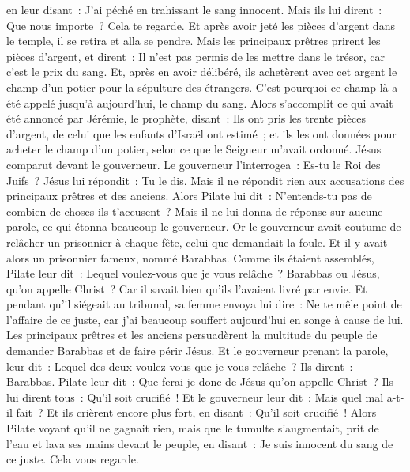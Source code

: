 \begin{multicols}{2}
en leur disant~: J'ai péché en trahissant le sang innocent. Mais ils lui dirent~: Que nous importe~? Cela te regarde.
Et après avoir jeté les pièces d'argent dans le temple, il se retira et alla se pendre.
Mais les principaux prêtres prirent les pièces d'argent, et dirent~: Il n'est pas permis de les mettre dans le trésor, car c'est le prix du sang.
Et, après en avoir délibéré, ils achetèrent avec cet argent le champ d'un potier pour la sépulture des étrangers.
C'est pourquoi ce champ-là a été appelé jusqu'à aujourd'hui, le champ du sang.
Alors s'accomplit ce qui avait été annoncé par Jérémie, le prophète, disant~: Ils ont pris les trente pièces d'argent, de celui que les enfants d'Israël ont estimé~;
et ils les ont données pour acheter le champ d'un potier, selon ce que le Seigneur m'avait ordonné.
Jésus comparut devant le gouverneur. Le gouverneur l'interrogea~: Es-tu le Roi des Juifs~? Jésus lui répondit~: Tu le dis.
Mais il ne répondit rien aux accusations des principaux prêtres et des anciens.
Alors Pilate lui dit~: N'entends-tu pas de combien de choses ils t'accusent~?
Mais il ne lui donna de réponse sur aucune parole, ce qui étonna beaucoup le gouverneur.
Or le gouverneur avait coutume de relâcher un prisonnier à chaque fête, celui que demandait la foule.
Et il y avait alors un prisonnier fameux, nommé Barabbas.
Comme ils étaient assemblés, Pilate leur dit~: Lequel voulez-vous que je vous relâche~? Barabbas ou Jésus, qu'on appelle Christ~?
Car il savait bien qu'ils l'avaient livré par envie.
Et pendant qu'il siégeait au tribunal, sa femme envoya lui dire~: Ne te mêle point de l'affaire de ce juste, car j'ai beaucoup souffert aujourd'hui en songe à cause de lui.
Les principaux prêtres et les anciens persuadèrent la multitude du peuple de demander Barabbas et de faire périr Jésus.
Et le gouverneur prenant la parole, leur dit~: Lequel des deux voulez-vous que je vous relâche~? Ils dirent~: Barabbas.
Pilate leur dit~: Que ferai-je donc de Jésus qu'on appelle Christ~? Ils lui dirent tous~: Qu'il soit crucifié~!
Et le gouverneur leur dit~: Mais quel mal a-t-il fait~? Et ils crièrent encore plus fort, en disant~: Qu'il soit crucifié~!
Alors Pilate voyant qu'il ne gagnait rien, mais que le tumulte s'augmentait, prit de l'eau et lava ses mains devant le peuple, en disant~: Je suis innocent du sang de ce juste. Cela vous regarde.

\end{multicols}
